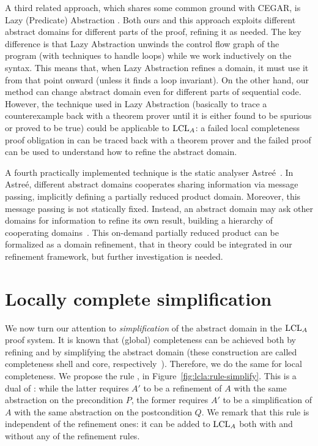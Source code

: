 A third related approach, which shares some common ground with CEGAR, is Lazy (Predicate) Abstraction \cite{HJMS02,McMillan06}. Both ours and this approach exploits different abstract domains for different parts of the proof, refining it as needed. The key difference is that Lazy Abstraction unwinds the control flow graph of the program (with techniques to handle loops) while we work inductively on the syntax. This means that, when Lazy Abstraction refines a domain, it must use it from that point onward (unless it finds a loop invariant). On the other hand, our method can change abstract domain even for different parts of sequential code. However, the technique used in Lazy Abstraction (basically to trace a counterexample back with a theorem prover until it is either found to be spurious or proved to be true) could be applicable to $\text{LCL}_A$: a failed local completeness proof obligation in  can be traced back with a theorem prover and the failed proof can be used to understand how to refine the abstract domain.

A fourth practically implemented technique is the static analyser Astreé~\cite{CCFMMMR05}. In Astreé, different abstract domains cooperates sharing information via message passing, implicitly defining a partially reduced product domain. Moreover, this message passing is not statically fixed. Instead, an abstract domain may ask other domains for information to refine its own result, building a hierarchy of cooperating domains~\cite{CCFMMMR06}. This on-demand partially reduced product can be formalized as a domain refinement, that in theory could be integrated in our refinement framework, but further investigation is needed.

\section{Locally complete simplification}\label{sec:lcla:simplification}
We now turn our attention to \emph{simplification} of the abstract domain in the $\text{LCL}_A$ proof system. It is known that (global) completeness can be achieved both by refining and by simplifying the abstract domain (these construction are called completeness shell and core, respectively~\cite{GRS00}). Therefore, we do the same for local completeness.
We propose the rule , in Figure~\ref{fig:lcla:rule-simplify}. This is a dual of : while the latter requires $A'$ to be a refinement of $A$ with the same abstraction on the precondition $P$, the former requires $A'$ to be a simplification of $A$ with the same abstraction on the postcondition $Q$. We remark that this rule is independent of the refinement ones: it can be added to $\text{LCL}_A$ both with and without any of the refinement rules.

